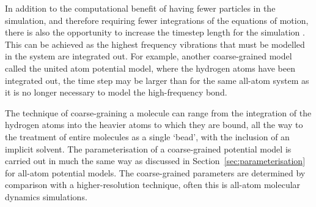 In addition to the computational benefit of having fewer particles in the simulation, and therefore requiring fewer integrations of the equations of motion, there is also the opportunity to increase the timestep length for the simulation \cite{pluhackova_biomembranes_2015}.
This can be achieved as the highest frequency vibrations that must be modelled in the system are integrated out.
For example, another coarse-grained model called the united atom potential model, where the hydrogen atoms have been integrated out, the time step may be larger than for the same all-atom system as it is no longer necessary to model the high-frequency  bond.

The technique of coarse-graining a molecule can range from the integration of the hydrogen atoms into the heavier atoms to which they are bound, all the way to the treatment of entire molecules as a single `bead', with the inclusion of an implicit solvent.
The parameterisation of a coarse-grained potential model is carried out in much the same way as discussed in Section~\ref{sec:parameterisation} for all-atom potential models.
The coarse-grained parameters are determined by comparison with a higher-resolution technique, often this is all-atom molecular dynamics simulations.
